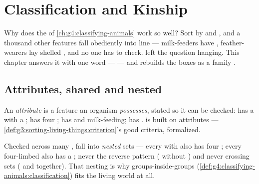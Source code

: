 \chapter{Classification and Kinship}\label{ch:g6:classification-kinship}

Why does the  of
\cref{ch:g4:classifying-animals} work so well? Sort 
by  and , and a thousand other features fall
obediently into line --- milk-feeders have ,
feather-wearers lay shelled , and no one has to check.
 left the question
hanging. This chapter answers it with one word --- 
--- and rebuilds the boxes as a family .

\section{Attributes, shared and nested}

\begin{definition}[Attribute]\label{def:g6:classification-kinship:attribute}
An \emph{attribute} is a feature an
organism \emph{possesses}, stated so it can be checked: has
a  with a ; has four ; has  and
milk-feeding; has .  is built on
attributes --- \cref{def:g3:sorting-living-things:criterion}'s
good criteria, formalized.
\end{definition}

\begin{proposition}\label{prop:g6:classification-kinship:nest}
Checked across many ,  fall into
\emph{nested} sets --- every  with  also has four
; every four-limbed  also has a ; never
the reverse pattern ( without ) and never
crossing sets ( and  together). That nesting is
why groups-inside-groups
(\cref{def:g4:classifying-animals:classification}) fits the
living world at all.
\end{proposition}
\admitted

